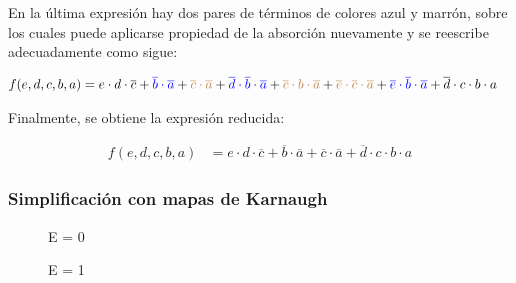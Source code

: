 En la \'ultima expresi\'on hay dos pares de t\'erminos de colores azul y marr\'on, sobre los cuales
puede aplicarse propiedad de la absorci\'on nuevamente y se reescribe adecuadamente como sigue:

\begin{equation*}
\begin{align*}
f(e,d,c,b,a) & = {e \cdot d \cdot \overline{c}}
+ {\color{blue} \overline{b} \cdot \overline{a}}
+ {\color{brown} \overline{c} \cdot \overline{a}}
+ {\color{blue} \overline{d} \cdot \overline{b} \cdot \overline{a}}
+ {\color{brown} \overline{c} \cdot b \cdot \overline{a}}
+ {\color{brown} \overline{e} \cdot \overline{c} \cdot \overline{a}}
+ {\color{blue} \overline{e} \cdot \overline{b} \cdot \overline{a}}
+ {\overline{d} \cdot c \cdot b \cdot a}
\end{align*}
\end{equation*}

Finalmente, se obtiene la expresi\'on reducida:

\begin{equation*}
\begin{align*}
f(e,d,c,b,a) & = {e \cdot d \cdot \overline{c}}
+ {\overline{b} \cdot \overline{a}}
+ {\overline{c} \cdot \overline{a}}
+ {\overline{d} \cdot c \cdot b \cdot a}
\end{align*}
\end{equation*}

\subsubsection{Simplificación con mapas de Karnaugh}

\begin{figure}[H]
    \centering
    \begin{Karnaugh}
    \end{Karnaugh}
    \caption{E = 0}
\end{figure}

\begin{figure}[H]
    \centering
    \begin{Karnaugh}
    \end{Karnaugh}
    \caption{E = 1}
\end{figure}

